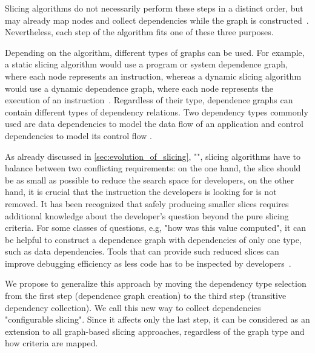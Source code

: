 Slicing algorithms do not necessarily perform these steps in a distinct order, but may already map nodes and collect dependencies while the graph is constructed~\cite{agrawal90:dynamic_program_slicing,zhang03:precise_dynamic_slicing_algorithms}.
Nevertheless, each step of the algorithm fits one of these three purposes.

Depending on the algorithm, different types of graphs can be used.
For example, a static slicing algorithm would use a program or system dependence graph, where each node represents an instruction, whereas a dynamic slicing algorithm would use a dynamic dependence graph, where each node represents the execution of an instruction~\cite{weiser81:program_slicing, korel90:dynamic_slicing_of_computer}.
Regardless of their type, dependence graphs can contain different types of dependency relations.
Two dependency types commonly used are data dependencies to model the data flow of an application and control dependencies to model its control flow \cite{weiser81:program_slicing, agrawal90:dynamic_program_slicing, zhang03:precise_dynamic_slicing_algorithms, korel90:dynamic_slicing_of_computer}.
\tmpEnd

As already discussed in \cref{sec:evolution_of_slicing}, "",
\tmpStart
slicing algorithms have to balance between two conflicting requirements: 
on the one hand, the slice should be as small as possible to reduce the search space for developers,
on the other hand, it is crucial that the instruction the developers is looking for is not removed.
It has been recognized that safely producing smaller slices requires additional knowledge about the developer's question beyond the pure slicing criteria.
For some classes of questions, e.g, "how was this value computed", it can be helpful to construct a dependence graph with dependencies of only one type, such as data dependencies.
Tools that can provide such reduced slices can improve debugging efficiency as less code has to be inspected by developers~\cite{agrawal93:debugging_with_dynamic_slicing, sridharan07:thin_slicing}.


We propose to generalize this approach by moving the dependency type selection from the first step (dependence graph creation) to the third step (transitive dependency collection).
We call this new way to collect dependencies "configurable slicing".
Since it affects only the last step, it can be considered as an extension to all graph-based slicing approaches, regardless of the graph type and how criteria are mapped.

